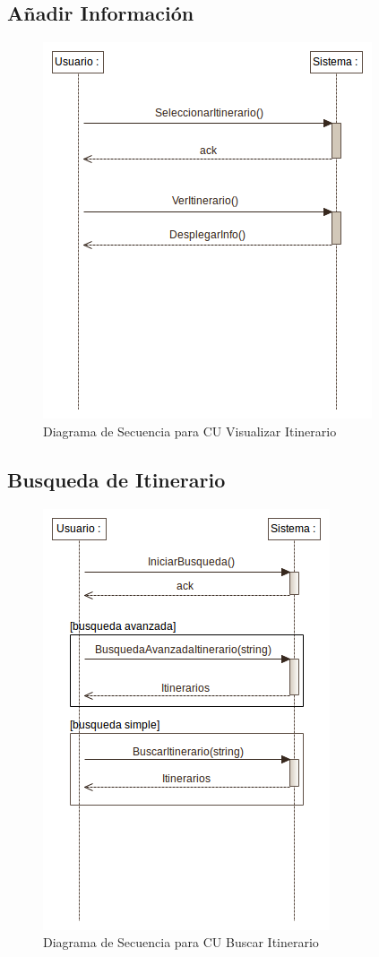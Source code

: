 \documentclass[12pt]{article}
\begin{document}
\subsection{Añadir Información}
\begin{center}\begin{figure}[htp]
\centering
\includegraphics[scale=0.50]{Diagramas/Secuencia/visualizar_itinerario.png}
\caption{Diagrama de Secuencia para CU Visualizar Itinerario}
\label{}
\end{figure}\end{center}
\subsection{Busqueda de Itinerario}
\begin{center}\begin{figure}[htp]
\centering
\includegraphics[scale=0.45]{Diagramas/Secuencia/busqueda_itinerario.png}
\caption{Diagrama de Secuencia para CU Buscar Itinerario}
\label{}
\end{figure}\end{center}
\newpage
\end{document}
